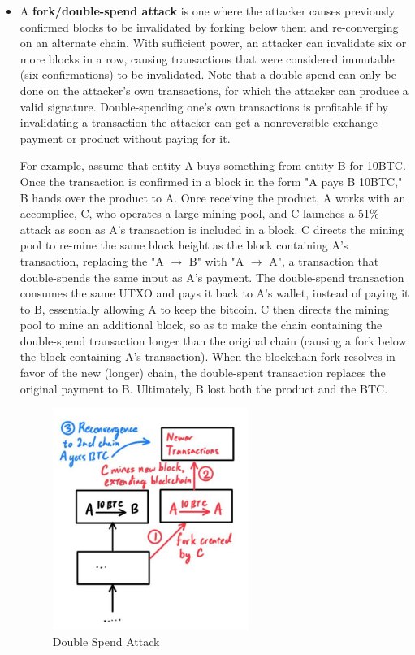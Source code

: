 \documentclass{article}
\begin{document}
    \begin{itemize}
      \item A \textbf{fork/double-spend attack} is one where the attacker causes previously confirmed blocks to be invalidated by forking below them and re-converging on an alternate chain. With sufficient power, an attacker can invalidate six or more blocks in a row, causing transactions that were considered immutable (six confirmations) to be invalidated. Note that a double-spend can only be done on the attacker's own transactions, for which the attacker can produce a valid signature. Double-spending one's own transactions is profitable if by invalidating a transaction the attacker can get a nonreversible exchange payment or product without paying for it.
      
      For example, assume that entity A buys something from entity B for 10BTC. Once the transaction is confirmed in a block in the form "A pays B 10BTC," B hands over the product to A. Once receiving the product, A works with an accomplice, C, who operates a large mining pool, and C launches a 51\% attack as soon as A's transaction is included in a block. C directs the mining pool to re-mine the same block height as the block containing A's transaction, replacing the "A $\rightarrow$ B" with "A $\rightarrow$ A", a transaction that double-spends the same input as A's payment. The double-spend transaction consumes the same UTXO and pays it back to A's wallet, instead of paying it to B, essentially allowing A to keep the bitcoin. C then directs the mining pool to mine an additional block, so as to make the chain containing the double-spend transaction longer than the original chain (causing a fork below the block containing A's transaction). When the blockchain fork resolves in favor of the new (longer) chain, the double-spent transaction replaces the original payment to B. Ultimately, B lost both the product and the BTC.

      \begin{figure}[H]
      \centering
      \includegraphics[width=0.6\textwidth]{img/Double_Spend_Attack.jpg}
      \caption{Double Spend Attack}
      \end{figure}


\end{itemize}
\end{document}
